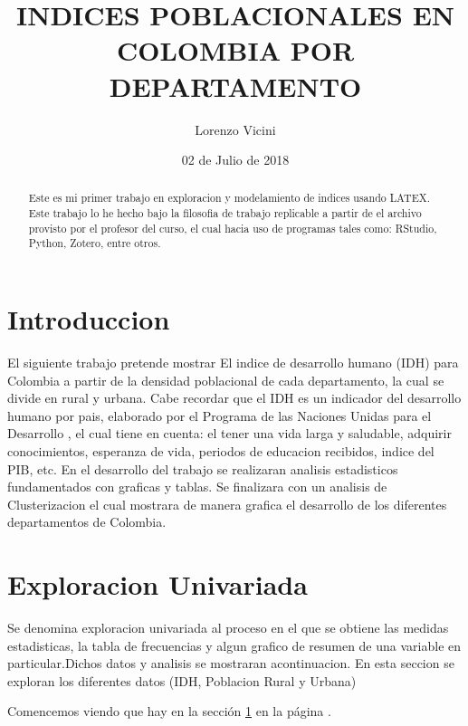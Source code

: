 \documentclass{article}
\title{INDICES POBLACIONALES EN COLOMBIA POR DEPARTAMENTO}
\author[]{\normalsize Lorenzo Vicini}
\affil[1,2]{\small  Escuela de Ingenieria,Universidad de los Andes\\
\texttt{{Herramientas Computacionales} le.vicini10@uniandes.edu.co}}
\date{02 de Julio de 2018}
\begin{document}

\maketitle
\begin{abstract}
Este es mi primer trabajo en exploracion y modelamiento de indices usando LATEX. Este trabajo lo he hecho bajo la filosofia de trabajo replicable a partir de el archivo provisto por el profesor del curso, el cual hacia uso de programas tales como: RStudio, Python, Zotero, entre otros.\cite{macqueen_methods_nodate}
\end{abstract}

\section*{Introduccion}

El siguiente trabajo pretende mostrar El indice de desarrollo humano (IDH) para Colombia a partir de la densidad poblacional de cada departamento, la cual se divide en rural y urbana. Cabe recordar que el IDH  es un indicador del desarrollo humano por pais, elaborado por el Programa de las Naciones Unidas para el Desarrollo , el cual tiene en cuenta: el tener una vida larga y saludable, adquirir conocimientos, esperanza de vida, periodos de educacion recibidos, indice del PIB, etc.  
En el desarrollo del trabajo se realizaran analisis estadisticos fundamentados con graficas y tablas. Se finalizara con un analisis de Clusterizacion el cual mostrara de manera grafica el desarrollo de los diferentes departamentos de Colombia. 

\clearpage


\section{Exploracion Univariada}\label{univariada}

Se denomina exploracion univariada al proceso en el que se obtiene las medidas estadisticas, la tabla de frecuencias y algun grafico de resumen de una variable en particular.Dichos datos  y analisis se mostraran acontinuacion. En esta seccion se exploran los diferentes datos  (IDH, Poblacion Rural y Urbana) 

Comencemos viendo que hay en la sección \ref{univariada} en la página \pageref{univariada}.
\end{document}
